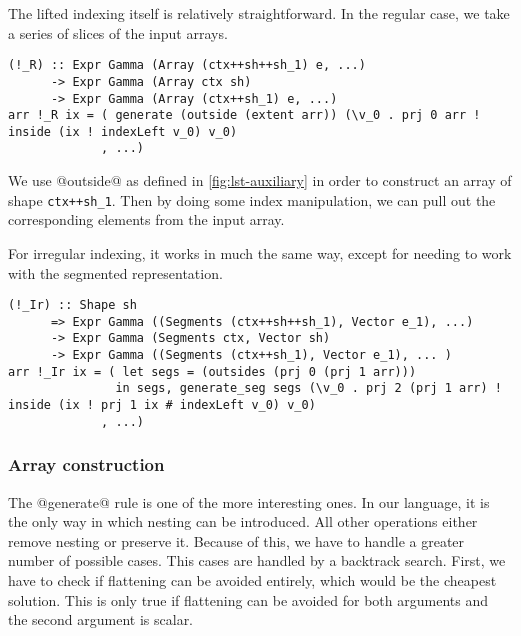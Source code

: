 The lifted indexing itself is relatively straightforward. In the regular case, we take a series of slices of the input arrays.
%
\begin{lstlisting}[style=ndp]
(!_R) :: Expr Gamma (Array (ctx++sh++sh_1) e, ...)
      -> Expr Gamma (Array ctx sh)
      -> Expr Gamma (Array (ctx++sh_1) e, ...)
arr !_R ix = ( generate (outside (extent arr)) (\v_0 . prj 0 arr ! inside (ix ! indexLeft v_0) v_0)
             , ...)
\end{lstlisting}
%
We use @outside@ as defined in \ref{fig:lst-auxiliary} in order to construct an array of shape \lstinline[style=ndp]{ctx++sh_1}. Then by doing some index manipulation, we can pull out the corresponding elements from the input array.

For irregular indexing, it works in much the same way, except for needing to work with the segmented representation.
%
\begin{lstlisting}[style=ndp]
(!_Ir) :: Shape sh
      => Expr Gamma ((Segments (ctx++sh++sh_1), Vector e_1), ...)
      -> Expr Gamma (Segments ctx, Vector sh)
      -> Expr Gamma ((Segments (ctx++sh_1), Vector e_1), ... )
arr !_Ir ix = ( let segs = (outsides (prj 0 (prj 1 arr)))
               in segs, generate_seg segs (\v_0 . prj 2 (prj 1 arr) ! inside (ix ! prj 1 ix # indexLeft v_0) v_0)
             , ...)
\end{lstlisting}

\subsubsection{Array construction}
The @generate@ rule is one of the more interesting ones. In our language, it is the only way in which nesting can be introduced. All other operations either remove nesting or preserve it. Because of this, we have to handle a greater number of possible cases. This cases are handled by a backtrack search. First, we have to check if flattening can be avoided entirely, which would be the cheapest solution. This is only true if flattening can be avoided for both arguments and the second argument is scalar.

